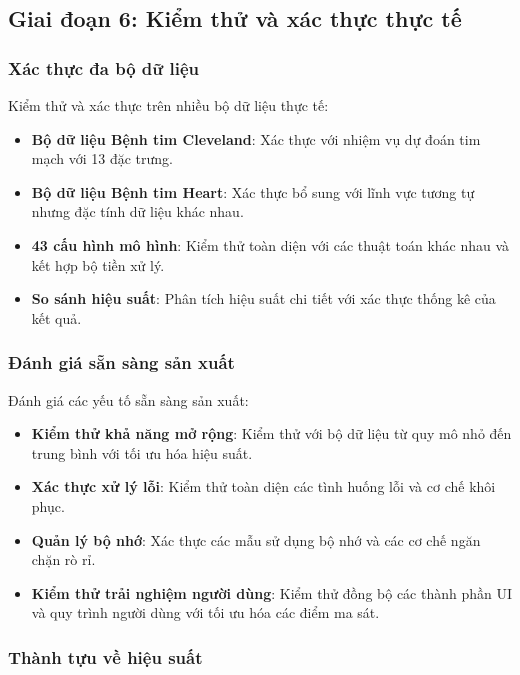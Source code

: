 \subsection{Giai đoạn 6: Kiểm thử và xác thực thực tế}\label{subsec:testing-stage}

\subsubsection{Xác thực đa bộ dữ liệu}

Kiểm thử và xác thực trên nhiều bộ dữ liệu thực tế:

\begin{itemize}
    \item \textbf{Bộ dữ liệu Bệnh tim Cleveland}: Xác thực với nhiệm vụ dự đoán tim mạch với 13 đặc trưng.
    \item \textbf{Bộ dữ liệu Bệnh tim Heart}: Xác thực bổ sung với lĩnh vực tương tự nhưng đặc tính dữ liệu khác nhau.
    \item \textbf{43 cấu hình mô hình}: Kiểm thử toàn diện với các thuật toán khác nhau và kết hợp bộ tiền xử lý.
    \item \textbf{So sánh hiệu suất}: Phân tích hiệu suất chi tiết với xác thực thống kê của kết quả.
\end{itemize}

\subsubsection{Đánh giá sẵn sàng sản xuất}

Đánh giá các yếu tố sẵn sàng sản xuất:

\begin{itemize}
    \item \textbf{Kiểm thử khả năng mở rộng}: Kiểm thử với bộ dữ liệu từ quy mô nhỏ đến trung bình với tối ưu hóa hiệu suất.
    \item \textbf{Xác thực xử lý lỗi}: Kiểm thử toàn diện các tình huống lỗi và cơ chế khôi phục.
    \item \textbf{Quản lý bộ nhớ}: Xác thực các mẫu sử dụng bộ nhớ và các cơ chế ngăn chặn rò rỉ.
    \item \textbf{Kiểm thử trải nghiệm người dùng}: Kiểm thử đồng bộ các thành phần UI và quy trình người dùng với tối ưu hóa các điểm ma sát.
\end{itemize}

\subsubsection{Thành tựu về hiệu suất}

